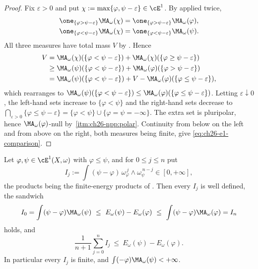 \begin{proof}
Fix \(\varepsilon>0\) and put \(\chi:=\max\{\varphi,\psi-\varepsilon\}\in\cE^1\).
By  applied twice,
\[
 \begin{aligned}
 \one_{\{\varphi>\psi-\varepsilon\}}\MA_\omega(\chi)
 &=\one_{\{\varphi>\psi-\varepsilon\}}\MA_\omega(\varphi),\\
 \one_{\{\varphi<\psi-\varepsilon\}}\MA_\omega(\chi)
 &=\one_{\{\varphi<\psi-\varepsilon\}}\MA_\omega(\psi).
 \end{aligned}
\]
All three measures have total mass \(V\) by
.  Hence
\[
\begin{split}
 V&=\MA_\omega(\chi)(\{\varphi<\psi-\varepsilon\})
   +\MA_\omega(\chi)(\{\varphi\geq\psi-\varepsilon\})\\
  &\geq\MA_\omega(\psi)(\{\varphi<\psi-\varepsilon\})
   +\MA_\omega(\varphi)(\{\varphi>\psi-\varepsilon\})\\
  &=\MA_\omega(\psi)(\{\varphi<\psi-\varepsilon\})
   +V-\MA_\omega(\varphi)(\{\varphi\leq\psi-\varepsilon\}),
\end{split}
\]
which rearranges to
\(\MA_\omega(\psi)(\{\varphi<\psi-\varepsilon\})\leq
\MA_\omega(\varphi)(\{\varphi\leq\psi-\varepsilon\})\).  Letting
\(\varepsilon\downarrow0\), the left-hand sets increase to
\(\{\varphi<\psi\}\) and the right-hand sets decrease to
\(\bigcap_{\varepsilon>0}\{\varphi\leq\psi-\varepsilon\}
=\{\varphi<\psi\}\cup\{\varphi=\psi=-\infty\}\).  The extra set is
pluripolar, hence \(\MA_\omega(\varphi)\)-null by
\,\cref{itm:ch26-npp:polar}.  Continuity from below
on the left and from above on the right, both measures being finite, give
\eqref{eq:ch26-e1-comparison}.
\end{proof}

\begin{proposition}
\label{prop:ch26-e1-cocycle}
Let \(\varphi,\psi\in\cE^1(X,\omega)\) with \(\varphi\leq\psi\), and for
\(0\leq j\leq n\) put
\[
 I_j:=\int(\psi-\varphi)\,
   \omega_\varphi^{\,j}\wedge\omega_\psi^{\,n-j}\in[0,+\infty],
\]
the products being the finite-energy products of
.  Then every \(I_j\) is well defined, the
sandwich
\begin{equation}
\label{eq:ch26-e1-sandwich}
 I_0=\int(\psi-\varphi)\MA_\omega(\psi)
 \ \leq\ E_\omega(\psi)-E_\omega(\varphi)\ \leq\
 \int(\psi-\varphi)\MA_\omega(\varphi)=I_n
\end{equation}
holds, and
\begin{equation}
\label{eq:ch26-e1-cocycle}
 \frac1{n+1}\sum_{j=0}^nI_j
 \ \leq\ E_\omega(\psi)-E_\omega(\varphi).
\end{equation}
In particular every \(I_j\) is finite, and
\(\int(-\varphi)\MA_\omega(\psi)<+\infty\).
\end{proposition}

